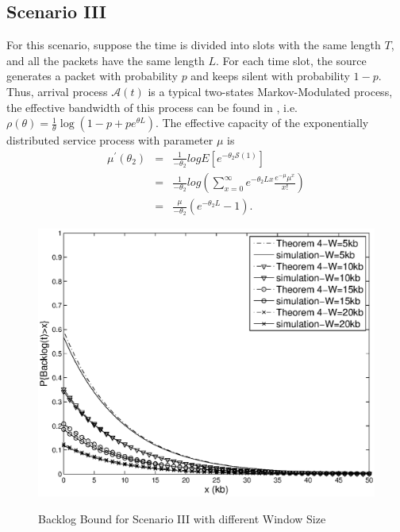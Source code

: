 \documentclass[paper]{ieice}
\begin{document}
\subsection{Scenario III}
For this scenario, suppose the time is divided into slots with the same length $T$, and all the packets have the same length $L$. For each time slot, the source generates a packet with probability $p$ and keeps silent with probability $1-p$. Thus, arrival process $\mathcal{A}(t)$ is a typical two-states Markov-Modulated process, the effective bandwidth of this process can be found in \cite{Chan94}, i.e. $\rho(\theta)=\frac{1}{\theta}\log(1-p+pe^{\theta L})$. The effective capacity of the exponentially distributed service process with parameter $\mu$ is
\begin{eqnarray*}
\mu^\prime(\theta_2)&=& \frac{1}{-\theta_2}log E[e^{-\theta_2 \mathcal{S}(1)}]\\
&=& \frac{1}{-\theta_2}log(\sum_{x=0}^\infty e^{-\theta_2 Lx}\frac{e^{-\mu}\mu^x}{x!})\\
&=& \frac{\mu}{-\theta_2}(e^{-\theta_2 L}-1).
\end{eqnarray*}
\begin{figure}[tbp]
  \centering
  \includegraphics[scale=0.45]{figures/backlogbuf.eps}\\
  \caption{Backlog Bound for Scenario III with different Window Size}\label{result1}
\end{figure}
\end{document}
